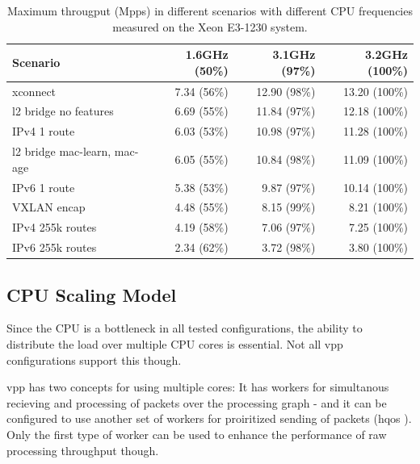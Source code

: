 

\begin{table}[!ht]
	\vspace{5ex}
	\begin{tabular}[]{ l r r r }
		Scenario & 1.6GHz (50\%) & 3.1GHz (97\%)  & 3.2GHz (100\%) \\ 
		\midrule
		xconnect & 7.34 (56\%) & 12.90 (98\%) & 13.20 (100\%) \\ %
		l2 bridge no features & 6.69 (55\%) & 11.84 (97\%) & 12.18 (100\%) \\ %
		IPv4 1 route & 6.03 (53\%) & 10.98 (97\%) & 11.28 (100\%) \\ %
		l2 bridge mac-learn, mac-age & 6.05 (55\%) & 10.84 (98\%) & 11.09 (100\%) \\ %
		IPv6 1 route & 5.38 (53\%) & 9.87 (97\%) & 10.14 (100\%) \\ %
		VXLAN encap & 4.48 (55\%) & 8.15 (99\%) & 8.21 (100\%) \\ %
		IPv4 255k routes & 4.19 (58\%) & 7.06 (97\%) & 7.25 (100\%) \\ %
		IPv6 255k routes & 2.34 (62\%) & 3.72 (98\%) & 3.80 (100\%) \\ %
		\midrule
	\end{tabular}
	\caption{Maximum througput (Mpps) in different scenarios with different CPU frequencies measured on the Xeon E3-1230 system. }
	\label{bottleneck}
\end{table}


\subsection{CPU Scaling Model}

Since the CPU is a bottleneck in all tested configurations, the
ability to distribute the load over multiple CPU cores is
essential. Not all \Ac{vpp} configurations support this though.

\Ac{vpp} has two concepts for using multiple cores: It has workers for
simultanous recieving and processing of packets over the processing
graph - and it can be configured to use another set of workers for
proiritized sending of packets (\Ac{hqos} \cite{vppdocs:qos}
\cite{vppdocs:hqosplacement}). Only the first type of worker can be
used to enhance the performance of raw processing throughput though.

